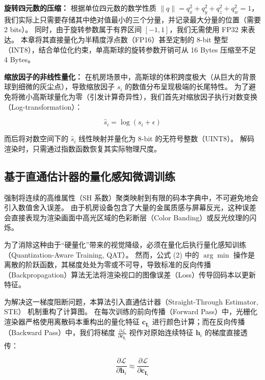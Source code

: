 \textbf{旋转四元数的压缩：} 根据单位四元数的数学性质 $\|q\| = q_x^2 + q_y^2 + q_z^2 + q_w^2 = 1$，我们实际上只需要存储其中绝对值最小的三个分量，并记录最大分量的位置（需要 2 bits）。
同时，由于旋转参数属于有界区间 $[-1, 1]$，我们无需使用 FP32 来表达。
本章将其直接量化为半精度浮点数（FP16）甚至定制的 8-bit 整型（INT8），结合单位化约束，单高斯球的旋转参数开销可从 16 Bytes 压缩至不足 4 Bytes。

\textbf{缩放因子的非线性量化：} 在机房场景中，高斯球的体积跨度极大（从巨大的背景球到细微的灰尘点），导致缩放因子 $s_i$ 的数值分布呈现极端的长尾特性。
为了避免将微小高斯球量化为零（引发计算奇异性），我们首先对缩放因子执行对数变换（Log-transformation）：

\begin{equation}
    \hat{s}_i = \log(s_i + \epsilon)
\end{equation}

而后将对数空间下的 $\hat{s}_i$ 线性映射并量化为 8-bit 的无符号整数（UINT8）。
解码渲染时，只需通过指数函数恢复其实际物理尺度。

\subsection{基于直通估计器的量化感知微调训练}
\label{subsec:qat_finetuning}

强制将连续的高维属性（SH 系数）聚类映射到有限的码本字典中，不可避免地会引入数值舍入误差。
由于机房设备包含了大量的金属质感与屏幕反光，这种误差会直接表现为渲染画面中高光区域的色彩断层（Color Banding）或反光纹理的闪烁。

为了消除这种由于“硬量化”带来的视觉降级，必须在量化后执行量化感知训练（Quantization-Aware Training, QAT）\cite{jacob2018quantization}。
然而，公式 (2) 中的 $\arg\min$ 操作是离散的阶跃函数，其梯度处处为零或不可导，导致标准的反向传播（Backpropagation）算法无法将渲染视口的图像误差（Loss）传导回码本以更新特征。

为解决这一梯度阻断问题，本算法引入直通估计器（Straight-Through Estimator, STE）\cite{bengio2013estimating} 机制重构了计算图。
在每次训练的前向传播（Forward Pass）中，光栅化渲染器严格使用离散码本重构出的量化特征 $\mathbf{c}_{\mathbf{I}_i}$ 进行颜色计算；而在反向传播（Backward Pass）中，我们将梯度 $\frac{\partial \mathcal{L}}{\partial \mathbf{c}_{\mathbf{I}_i}}$ 视作对原始连续特征 $\mathbf{h}_i$ 的梯度直接透传：

\begin{equation}
    \frac{\partial \mathcal{L}}{\partial \mathbf{h}_i} \approx \frac{\partial \mathcal{L}}{\partial \mathbf{c}_{\mathbf{I}_i}}
\end{equation}

